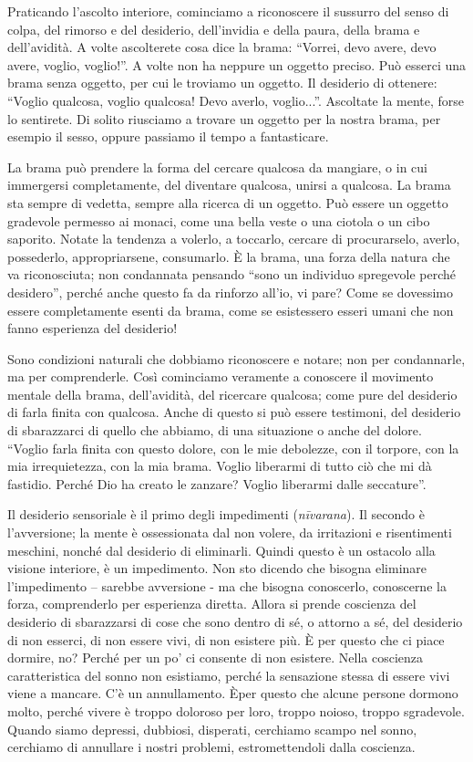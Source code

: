 
Praticando l'ascolto interiore, cominciamo a riconoscere il sussurro del
senso di colpa, del rimorso e del desiderio, dell'invidia e della paura,
della brama e dell'avidità. A volte ascolterete cosa dice la brama:
``Vorrei, devo avere, devo avere, voglio, voglio!''. A volte non ha
neppure un oggetto preciso. Può esserci una brama senza oggetto, per cui
le troviamo un oggetto. Il desiderio di ottenere: ``Voglio qualcosa,
voglio qualcosa! Devo averlo, voglio...''. Ascoltate la mente, forse lo
sentirete. Di solito riusciamo a trovare un oggetto per la nostra brama,
per esempio il sesso, oppure passiamo il tempo a fantasticare.

La brama può prendere la forma del cercare qualcosa da mangiare, o in
cui immergersi completamente, del diventare qualcosa, unirsi a qualcosa.
La brama sta sempre di vedetta, sempre alla ricerca di un oggetto. Può
essere un oggetto gradevole permesso ai monaci, come una bella veste o
una ciotola o un cibo saporito. Notate la tendenza a volerlo, a
toccarlo, cercare di procurarselo, averlo, possederlo, appropriarsene,
consumarlo. È la brama, una forza della natura che va riconosciuta; non
condannata pensando ``sono un individuo spregevole perché desidero'',
perché anche questo fa da rinforzo all'io, vi pare? Come se dovessimo
essere completamente esenti da brama, come se esistessero esseri umani
che non fanno esperienza del desiderio!

Sono condizioni naturali che dobbiamo riconoscere e notare; non per
condannarle, ma per comprenderle. Così cominciamo veramente a conoscere
il movimento mentale della brama, dell'avidità, del ricercare qualcosa;
come pure del desiderio di farla finita con qualcosa. Anche di questo si
può essere testimoni, del desiderio di sbarazzarci di quello che
abbiamo, di una situazione o anche del dolore. ``Voglio farla finita con
questo dolore, con le mie debolezze, con il torpore, con la mia
irrequietezza, con la mia brama. Voglio liberarmi di tutto ciò che mi dà
fastidio. Perché Dio ha creato le zanzare? Voglio liberarmi dalle
seccature''.

Il desiderio sensoriale è il primo degli impedimenti (\textit{nīvarana}). Il
secondo è l'avversione; la mente è ossessionata dal non volere, da
irritazioni e risentimenti meschini, nonché dal desiderio di eliminarli.
Quindi questo è un ostacolo alla visione interiore, è un impedimento.
Non sto dicendo che bisogna eliminare l'impedimento – sarebbe avversione
- ma che bisogna conoscerlo, conoscerne la forza, comprenderlo per
esperienza diretta. Allora si prende coscienza del desiderio di
sbarazzarsi di cose che sono dentro di sé, o attorno a sé, del desiderio
di non esserci, di non essere vivi, di non esistere più. È per questo
che ci piace dormire, no? Perché per un po' ci consente di non esistere.
Nella coscienza caratteristica del sonno non esistiamo, perché la
sensazione stessa di essere vivi viene a mancare. C'è un annullamento.
Èper questo che alcune persone dormono molto, perché vivere è troppo
doloroso per loro, troppo noioso, troppo sgradevole. Quando siamo
depressi, dubbiosi, disperati, cerchiamo scampo nel sonno, cerchiamo di
annullare i nostri problemi, estromettendoli dalla coscienza.

